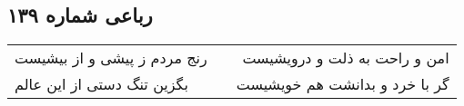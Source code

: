 \begin{center}
\section*{رباعی شماره ۱۳۹}
\label{sec:sh139}
\begin{longtable}{l p{0.5cm} r}
رنج مردم ز پیشی و از بیشیست
&&
امن و راحت به ذلت و درویشیست
\\
بگزین تنگ دستی از این عالم
&&
گر با خرد و بدانشت هم خویشیست
\\
\end{longtable}
\end{center}
